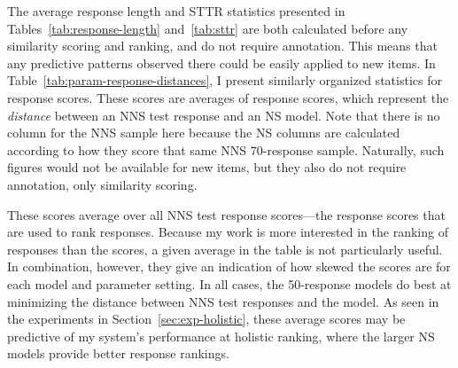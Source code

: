 The average response length and STTR statistics presented in Tables~\ref{tab:response-length} and~\ref{tab:sttr} are both calculated before any similarity scoring and ranking, and do not require annotation. This means that any predictive patterns observed there could be easily applied to new items. In Table~\ref{tab:param-response-distances}, I present similarly organized statistics for response scores. These scores are averages of response scores, which represent the \textit{distance} between an NNS test response and an NS model. Note that there is no column for the NNS sample here because the NS columns are calculated according to how they score that same NNS 70-response sample. Naturally, such figures would not be available for new items, but they also do not require annotation, only similarity scoring.

These scores average over all NNS test response scores---the response scores that are used to rank responses. Because my work is more interested in the ranking of responses than the scores, a given average in the table is not particularly useful. In combination, however, they give an indication of how skewed the scores are for each model and parameter setting. In all cases, the 50-response  models do best at minimizing the distance between NNS test responses and the model. As seen in the experiments in Section~\ref{sec:exp-holistic}, these average scores may be predictive of my system's performance at holistic ranking, where the larger NS models provide better response rankings.


